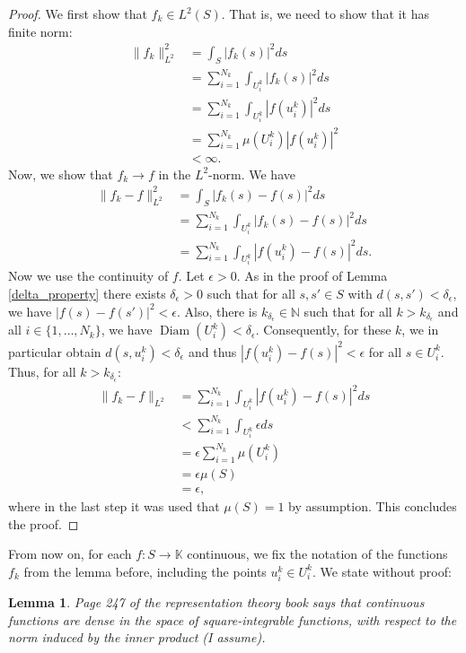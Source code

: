 \documentclass[12pt, a4paper]{article}
\theoremstyle{plain}
\newtheorem{lem}[pro]{Lemma}
\theoremstyle{definition}
\theoremstyle{remark}
\newcommand{\N}{\mathds{N}}
\newcommand{\K}{\mathds{K}}
\DeclareMathOperator{\diam}{Diam}
\begin{document}
\begin{proof}
We first show that $f_k \in L^2(S)$. That is, we need to show that it has finite norm:
\begin{align*}
\|f_k\|_{L^2}^2 & = \int_{S} |f_k(s)|^2 ds \\
& = \sum_{i= 1}^{N_k} \int_{U_i^k} |f_k(s)|^2 ds \\
& = \sum_{i= 1}^{N_k} \int_{U_i^k} |f(u_i^k)|^2 ds \\
& = \sum_{i = 1}^{N_k} \mu(U_i^k) |f(u_i^k)|^2 \\
& < \infty.
\end{align*}
Now, we show that $f_k \to f$ in the $L^2$-norm. We have
\begin{align*}
\|f_k - f\|_{L^2}^2 & = \int_S |f_k(s) - f(s)|^2 ds \\
& = \sum_{i = 1}^{N_k} \int_{U_i^k} |f_k(s) - f(s)|^2 ds \\
& = \sum_{i = 1}^{N_k} \int_{U_i^k} |f(u_i^k) - f(s)|^2 ds.
\end{align*}
Now we use the continuity of $f$. Let $\epsilon > 0$. As in the proof of Lemma \ref{delta_property} there exists $\delta_{\epsilon} > 0$ such that for all $s, s' \in S$ with $d(s, s') < \delta_{\epsilon}$, we have $|f(s) - f(s')|^2 < \epsilon$. Also, there is $k_{\delta_{\epsilon}} \in \N$ such that for all $k > k_{\delta_{\epsilon}}$ and all $i \in \{1, \dots, N_k\}$, we have $\diam(U_i^k) < \delta_{\epsilon}$. Consequently, for these $k$, we in particular obtain $d(s, u_i^k) < \delta_{\epsilon}$ and thus $|f(u_i^k) - f(s)|^2 < \epsilon$ for all $s \in U_i^k$. Thus, for all $k > k_{\delta_{\epsilon}}$:
\begin{align*}
\|f_k - f\|_{L^2} & = \sum_{i = 1}^{N_k} \int_{U_i^k} |f(u_i^k) - f(s)|^2 ds \\
& < \sum_{i = 1}^{N_k} \int_{U_i^k} \epsilon ds \\
& = \epsilon \sum_{i = 1}^{N_k} \mu(U_i^k) \\
& = \epsilon \mu(S) \\
& = \epsilon,
\end{align*}
where in the last step it was used that $\mu(S) = 1$ by assumption. This concludes the proof.
\end{proof}

From now on, for each $f: S \to \K$ continuous, we fix the notation of the functions $f_k$ from the lemma before, including the points $u_i^k \in U_i^k$. We state without proof:

\begin{lem}\label{continuous dense}
Page 247 of the representation theory book says that continuous functions are dense in the space of square-integrable functions, with respect to the norm induced by the inner product (I assume).
\end{lem}
\end{document}
